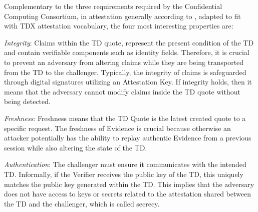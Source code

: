 Complementary to the three requirements required by the Confidential Computing Consortium, in attestation generally according to \cite{sardar_demystifying_2021}, adapted to fit with TDX attestation vocabulary, the four most interesting properties are:

\label{FourProperties}
\textit{Integrity}: Claims within the TD quote, represent the present condition of the TD and contain verifiable components such as identity fields. Therefore, it is crucial to prevent an adversary from altering claims while they are being transported from the TD to the challenger. Typically, the integrity of claims is safeguarded through digital signatures utilizing an Attestation Key. If integrity holds, then it means that the adversary cannot modify claims inside the TD quote without being detected.

\textit{Freshness}: Freshness means that the TD Quote is the latest created quote to a specific request. The freshness of Evidence is crucial because otherwise an attacker potentially has the ability to replay authentic Evidence from a previous session while also altering the state of the TD.


\textit{Authentication}: The challenger must ensure it communicates with the intended TD. Informally, if the Verifier receives the public key of the TD, this uniquely matches the public key generated within the TD. This implies that the adversary does not have access to keys or secrets related to the attestation shared between the TD and the challenger, which is called secrecy.

